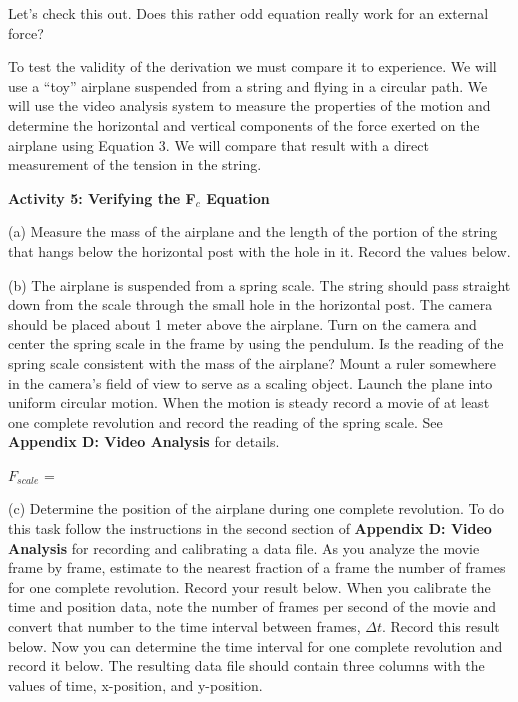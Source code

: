 Let's check this out. Does this rather odd equation really work for an external
force?

To test the validity of the derivation we must compare it to experience. We
will use a ``toy'' airplane suspended from a string and flying
in a circular path. We will use the video analysis system to measure the properties
of the motion and determine the horizontal and vertical components of the force
exerted on the airplane using Equation 3. We will compare that result with a
direct measurement of the tension in the string. 

\textbf{Activity 5: Verifying the F\( _{c} \) Equation }

(a) Measure the mass of the airplane and the length of the portion of the string
that hangs below the horizontal post with the hole in it. Record the values
below. 
\vspace{10mm}

(b) The airplane is suspended from a spring scale. The string should pass straight
down from the scale through the small hole in the horizontal post. The camera
should be placed about 1 meter above the airplane. Turn on the camera and center
the spring scale in the frame by using the pendulum. Is the reading of the spring
scale consistent with the mass of the airplane? Mount a ruler somewhere in the
camera's field of view to serve as a scaling object. Launch the plane into uniform
circular motion. When the motion is steady record a movie of at least one complete
revolution and record the reading of the spring scale. See \textbf{Appendix
D: Video Analysis} for details. 

\hspace{0.5in} \( F_{scale} \) = 

(c) Determine the position of the airplane during one complete revolution. To
do this task follow the instructions in the second section of \textbf{Appendix
D: Video Analysis} for recording and calibrating a data file.
As you analyze the movie frame by frame, estimate to the nearest fraction
of a frame the number of frames for one complete revolution. Record your result below.
When you calibrate the time and position data, note the number of frames per
second of the movie and convert that number to the time interval between frames,
\( \Delta  t\). Record this result below. Now you can determine the time interval for one complete revolution and record it below. The resulting data file should contain three columns with the values of
time, x-position, and y-position.

